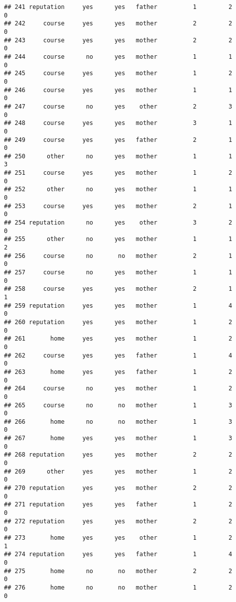 \documentclass[]{article}
\begin{document}
\begin{verbatim}
## 241 reputation     yes      yes   father          1         2        0
## 242     course     yes      yes   mother          2         2        0
## 243     course     yes      yes   mother          2         2        0
## 244     course      no      yes   mother          1         1        0
## 245     course     yes      yes   mother          1         2        0
## 246     course     yes      yes   mother          1         1        0
## 247     course      no      yes    other          2         3        0
## 248     course     yes      yes   mother          3         1        0
## 249     course     yes      yes   father          2         1        0
## 250      other      no      yes   mother          1         1        3
## 251     course     yes      yes   mother          1         2        0
## 252      other      no      yes   mother          1         1        0
## 253     course     yes      yes   mother          2         1        0
## 254 reputation      no      yes    other          3         2        0
## 255      other      no      yes   mother          1         1        2
## 256     course      no       no   mother          2         1        0
## 257     course      no      yes   mother          1         1        0
## 258     course     yes      yes   mother          2         1        1
## 259 reputation     yes      yes   mother          1         4        0
## 260 reputation     yes      yes   mother          1         2        0
## 261       home     yes      yes   mother          1         2        0
## 262     course     yes      yes   father          1         4        0
## 263       home     yes      yes   father          1         2        0
## 264     course      no      yes   mother          1         2        0
## 265     course      no       no   mother          1         3        0
## 266       home      no       no   mother          1         3        0
## 267       home     yes      yes   mother          1         3        0
## 268 reputation     yes      yes   mother          2         2        0
## 269      other     yes      yes   mother          1         2        0
## 270 reputation     yes      yes   mother          2         2        0
## 271 reputation     yes      yes   father          1         2        0
## 272 reputation     yes      yes   mother          2         2        0
## 273       home     yes      yes    other          1         2        1
## 274 reputation     yes      yes   father          1         4        0
## 275       home      no       no   mother          2         2        0
## 276       home      no       no   mother          1         2        0

\end{verbatim}
\end{document}
